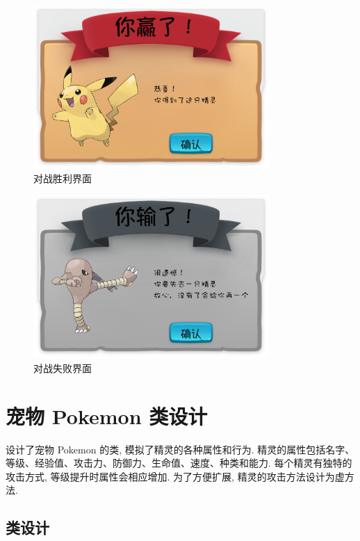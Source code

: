 \begin{figure}[H]
    \centering
    \includegraphics[width=0.8\textwidth]{win.png}
    \caption{对战胜利界面}
\end{figure}

\begin{figure}[H]
    \centering
    \includegraphics[width=0.8\textwidth]{lose.png}
    \caption{对战失败界面}
\end{figure}

\section{宠物 Pokemon 类设计}

设计了宠物 Pokemon 的类, 模拟了精灵的各种属性和行为. 精灵的属性包括名字、等级、经验值、攻击力、防御力、生命值、速度、种类和能力. 每个精灵有独特的攻击方式, 等级提升时属性会相应增加. 为了方便扩展, 精灵的攻击方法设计为虚方法.

\subsection{类设计}

